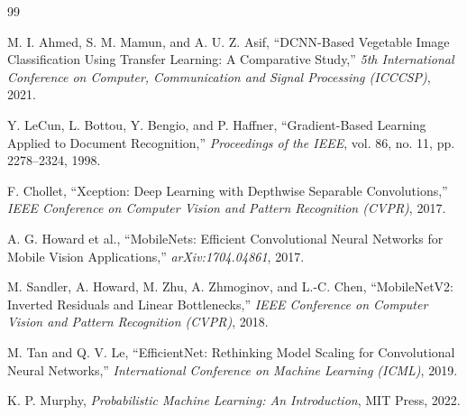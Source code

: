 \begin{thebibliography}{99}

M. I. Ahmed, S. M. Mamun, and A. U. Z. Asif,
``DCNN-Based Vegetable Image Classification Using Transfer Learning: A Comparative Study,''
\textit{5th International Conference on Computer, Communication and Signal Processing (ICCCSP)}, 2021.

Y. LeCun, L. Bottou, Y. Bengio, and P. Haffner,
``Gradient-Based Learning Applied to Document Recognition,''
\textit{Proceedings of the IEEE}, vol. 86, no. 11, pp. 2278--2324, 1998.

F. Chollet,
``Xception: Deep Learning with Depthwise Separable Convolutions,''
\textit{IEEE Conference on Computer Vision and Pattern Recognition (CVPR)}, 2017.

A. G. Howard et al.,
``MobileNets: Efficient Convolutional Neural Networks for Mobile Vision Applications,''
\textit{arXiv:1704.04861}, 2017.

M. Sandler, A. Howard, M. Zhu, A. Zhmoginov, and L.-C. Chen,
``MobileNetV2: Inverted Residuals and Linear Bottlenecks,''
\textit{IEEE Conference on Computer Vision and Pattern Recognition (CVPR)}, 2018.

M. Tan and Q. V. Le,
``EfficientNet: Rethinking Model Scaling for Convolutional Neural Networks,''
\textit{International Conference on Machine Learning (ICML)}, 2019.

K. P. Murphy,
\textit{Probabilistic Machine Learning: An Introduction},
MIT Press, 2022.

\end{thebibliography}



